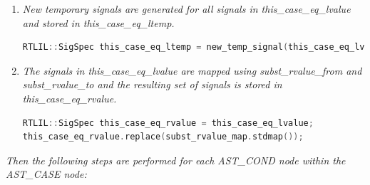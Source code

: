 \documentclass[11pt]{report}
\begin{document}
\begin{enumerate}
\item \textit{New temporary signals are generated for all signals in this\_case\_eq\_lvalue and stored in this\_case\_eq\_ltemp.}
\begin{lstlisting}[language=C++]
RTLIL::SigSpec this_case_eq_ltemp = new_temp_signal(this_case_eq_lvalue);
\end{lstlisting}

\item \textit{The signals in this\_case\_eq\_lvalue are mapped using subst\_rvalue\_from and subst\_rvalue\_to and
the resulting set of signals is stored in this\_case\_eq\_rvalue.}
\begin{lstlisting}[language=C++]
RTLIL::SigSpec this_case_eq_rvalue = this_case_eq_lvalue;
this_case_eq_rvalue.replace(subst_rvalue_map.stdmap());	
\end{lstlisting}

\end{enumerate}


\textit{Then the following steps are performed for each AST\_COND node within the AST\_CASE node:
}
\end{document}
